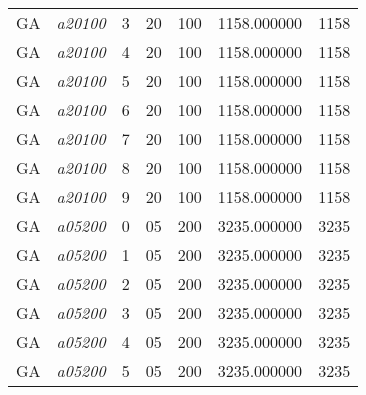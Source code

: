 {\begin{longtable}{cc|c|cc|cc}
			GA                 & \textit{a20100}    & 3                               & 20               & 100              & 1158.000000                          & 1158 \\  
			GA                 & \textit{a20100}    & 4                               & 20               & 100              & 1158.000000                          & 1158 \\  
			GA                 & \textit{a20100}    & 5                               & 20               & 100              & 1158.000000                          & 1158 \\  
			GA                 & \textit{a20100}    & 6                               & 20               & 100              & 1158.000000                          & 1158 \\  
			GA                 & \textit{a20100}    & 7                               & 20               & 100              & 1158.000000                          & 1158 \\  
			GA                 & \textit{a20100}    & 8                               & 20               & 100              & 1158.000000                          & 1158 \\  
			GA                 & \textit{a20100}    & 9                               & 20               & 100              & 1158.000000                          & 1158 \\  \hline
			GA                 & \textit{a05200}    & 0                               & 05               & 200              & 3235.000000                          & 3235 \\  
			GA                 & \textit{a05200}    & 1                               & 05               & 200              & 3235.000000                          & 3235 \\  
			GA                 & \textit{a05200}    & 2                               & 05               & 200              & 3235.000000                          & 3235 \\  
			GA                 & \textit{a05200}    & 3                               & 05               & 200              & 3235.000000                          & 3235 \\  
			GA                 & \textit{a05200}    & 4                               & 05               & 200              & 3235.000000                          & 3235 \\  
			GA                 & \textit{a05200}    & 5                               & 05               & 200              & 3235.000000                          & 3235 \\  

\end{longtable}}
